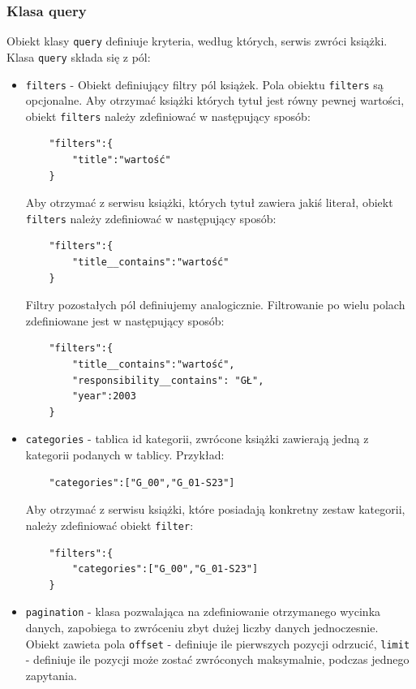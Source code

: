 \documentclass[twoside]{projektInzynierskiMS}
\begin{document}
\subsubsection{Klasa query}
Obiekt klasy \verb`query` definiuje kryteria, według których, serwis zwróci książki. Klasa \verb`query` składa się z pól:
\begin{itemize}
	\item \verb`filters` - Obiekt definiujący filtry pól książek. Pola obiektu \verb`filters` są opcjonalne. Aby otrzymać książki których tytuł jest równy pewnej wartości, obiekt \verb`filters` należy zdefiniować w następujący sposób:
	
	\begin{verbatim}
	"filters":{
	    "title":"wartość"
	}
	\end{verbatim}
	
Aby otrzymać z serwisu książki, których tytuł zawiera jakiś literał, obiekt \verb`filters` należy zdefiniować w następujący sposób:
	\begin{verbatim}
	"filters":{
	    "title__contains":"wartość"
	}
	\end{verbatim}
	
Filtry pozostałych pól definiujemy analogicznie. Filtrowanie po wielu polach zdefiniowane jest w następujący sposób:

	\begin{verbatim}
	"filters":{
	    "title__contains":"wartość",
	    "responsibility__contains": "GŁ",
	    "year":2003
	}
	\end{verbatim}
	
\item \verb`categories` - tablica id kategorii, zwrócone książki zawierają jedną z kategorii podanych w tablicy. Przykład:

	\begin{verbatim}
	"categories":["G_00","G_01-S23"]
	\end{verbatim}

Aby otrzymać z serwisu książki, które posiadają konkretny zestaw kategorii, należy zdefiniować obiekt \verb`filter`:
 
	\begin{verbatim}
	"filters":{
	    "categories":["G_00","G_01-S23"]
	}
	\end{verbatim}

\item \verb`pagination` - klasa pozwalająca na zdefiniowanie otrzymanego wycinka danych, zapobiega to zwróceniu zbyt dużej liczby danych jednoczesnie. Obiekt zawieta pola \verb`offset` - definiuje ile pierwszych pozycji odrzucić, \verb`limit` - definiuje ile pozycji może zostać zwróconych maksymalnie, podczas jednego zapytania.

\end{itemize}
\end{document}
